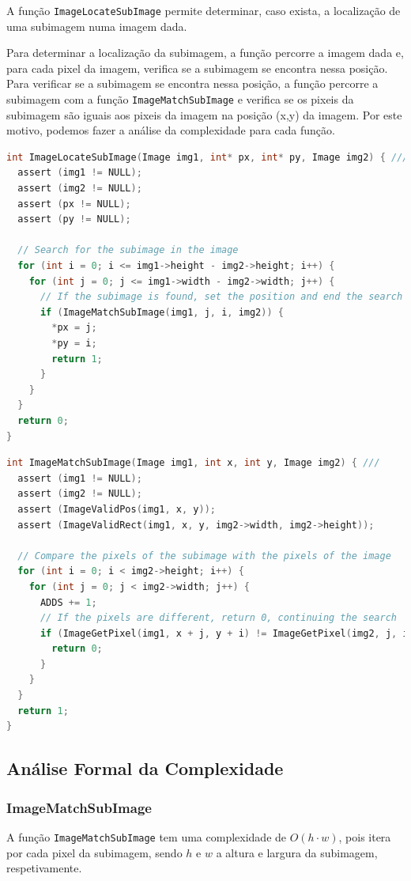 \documentclass{report}
\begin{document}
A função \texttt{ImageLocateSubImage} permite determinar, caso exista, a localização de uma subimagem numa imagem dada.
\par
Para determinar a localização da subimagem, a função percorre a imagem dada e, para cada pixel da imagem, verifica se a subimagem se encontra nessa posição. 
Para verificar se a subimagem se encontra nessa posição, a função percorre a subimagem com a função \texttt{ImageMatchSubImage} e verifica se os pixeis da subimagem são iguais aos pixeis da imagem na posição (x,y) da imagem.
Por este motivo, podemos fazer a análise da complexidade para cada função.
\par
\begingroup
\begin{lstlisting}[language=C]
int ImageLocateSubImage(Image img1, int* px, int* py, Image img2) { ///
  assert (img1 != NULL);
  assert (img2 != NULL);
  assert (px != NULL);
  assert (py != NULL);

  // Search for the subimage in the image
  for (int i = 0; i <= img1->height - img2->height; i++) {
    for (int j = 0; j <= img1->width - img2->width; j++) {
      // If the subimage is found, set the position and end the search
      if (ImageMatchSubImage(img1, j, i, img2)) {
        *px = j;
        *py = i;
        return 1;
      }
    }
  }
  return 0;
}
\end{lstlisting}
    
\begin{lstlisting}[language=C]
int ImageMatchSubImage(Image img1, int x, int y, Image img2) { ///
  assert (img1 != NULL);
  assert (img2 != NULL);
  assert (ImageValidPos(img1, x, y));
  assert (ImageValidRect(img1, x, y, img2->width, img2->height));

  // Compare the pixels of the subimage with the pixels of the image
  for (int i = 0; i < img2->height; i++) {
    for (int j = 0; j < img2->width; j++) {
      ADDS += 1;
      // If the pixels are different, return 0, continuing the search
      if (ImageGetPixel(img1, x + j, y + i) != ImageGetPixel(img2, j, i)) {
        return 0;
      }
    }
  }
  return 1;
}
\end{lstlisting}
\endgroup

\subsection{Análise Formal da Complexidade}

\subsubsection*{ImageMatchSubImage}
A função \texttt{ImageMatchSubImage} tem uma complexidade de \(O(h \cdot w)\), pois itera por cada pixel da subimagem, 
sendo \(h\) e \(w\) a altura e largura da subimagem, respetivamente.
\par
\end{document}
